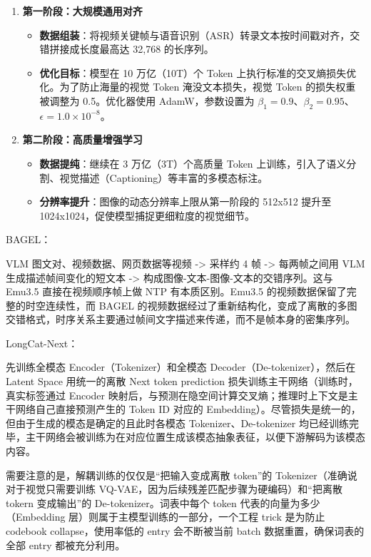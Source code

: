 \begin{enumerate}
\def\labelenumi{\arabic{enumi}.}
\tightlist
\item
  \textbf{第一阶段：大规模通用对齐}

  \begin{itemize}
  \tightlist
  \item
    \textbf{数据组装}：将视频关键帧与语音识别（ASR）转录文本按时间戳对齐，交错拼接成长度最高达 32,768 的长序列。
  \item
    \textbf{优化目标}：模型在 10 万亿（10T）个 Token 上执行标准的交叉熵损失优化。为了防止海量的视觉 Token 淹没文本损失，视觉 Token 的损失权重被调整为 0.5。优化器使用 AdamW，参数设置为 \(\beta_1=0.9\)、\(\beta_2=0.95\)、\(\epsilon=1.0\times10^{-8}\)。
  \end{itemize}
\item
  \textbf{第二阶段：高质量增强学习}

  \begin{itemize}
  \tightlist
  \item
    \textbf{数据提纯}：继续在 3 万亿（3T）个高质量 Token 上训练，引入了语义分割、视觉描述（Captioning）等丰富的多模态标注。
  \item
    \textbf{分辨率提升}：图像的动态分辨率上限从第一阶段的 512x512 提升至 1024x1024，促使模型捕捉更细粒度的视觉细节。
  \end{itemize}
\end{enumerate}

BAGEL：

VLM 图文对、视频数据、网页数据等视频 -\textgreater{} 采样约 4 帧 -\textgreater{} 每两帧之间用 VLM 生成描述帧间变化的短文本 -\textgreater{} 构成图像-文本-图像-文本的交错序列。这与 Emu3.5 直接在视频顺序帧上做 NTP 有本质区别。Emu3.5 的视频数据保留了完整的时空连续性，而 BAGEL 的视频数据经过了重新结构化，变成了离散的多图交错格式，时序关系主要通过帧间文字描述来传递，而不是帧本身的密集序列。

LongCat-Next：

先训练全模态 Encoder（Tokenizer）和全模态 Decoder（De-tokenizer），然后在 Latent Space 用统一的离散 Next token prediction 损失训练主干网络（训练时，真实标签通过 Encoder 映射后，与预测在隐空间计算交叉熵；推理时上下文是主干网络自己直接预测产生的 Token ID 对应的 Embedding）。尽管损失是统一的，但由于生成的模态是确定的且此时各模态 Tokenizer、De-tokenizer 均已经训练完毕，主干网络会被训练为在对应位置生成该模态抽象表征，以便下游解码为该模态内容。

需要注意的是，解耦训练的仅仅是``把输入变成离散 token''的 Tokenizer（准确说对于视觉只需要训练 VQ-VAE，因为后续残差匹配步骤为硬编码）和``把离散 tokern 变成输出''的 De-tokenizer。词表中每个 token 代表的向量为多少（Embedding 层）则属于主模型训练的一部分，一个工程 trick 是为防止 codebook collapse，使用率低的 entry 会不断被当前 batch 数据重置，确保词表的全部 entry 都被充分利用。


